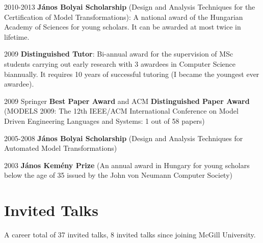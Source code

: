 \begin{yearlist}
\item[2010-2013] \textbf{J\'anos Bolyai Scholarship} (Design and Analysis Techniques for the Certification of Model Transformations): A national award of the Hungarian Academy of Sciences for young scholars. It can be awarded
at most twice in lifetime.
\item[2009] \textbf{Distinguished Tutor}: Bi-annual award for the supervision of MSc students carrying out early research with 3 awardees in Computer Science biannually. It requires 10 years of successful tutoring (I became the youngest ever awardee). 
\item[2009] Springer \textbf{Best Paper Award} and ACM \textbf{Distinguished Paper Award} (MODELS
2009: The 12th IEEE/ACM International Conference on Model Driven Engineering Languages and Systems: 1 out of 58 papers) 
\item[2005-2008] \textbf{J\'anos Bolyai Scholarship} (Design and Analysis Techniques for Automated Model Transformations) 
\item[2003] \textbf{J\'anos Kem\'eny Prize } (An annual award in Hungary for young scholars below the age of 35 issued by the John von Neumann Computer Society)
\end{yearlist}

\section{Invited Talks}

A career total of 37 invited talks, 8 invited talks since joining McGill University. 

